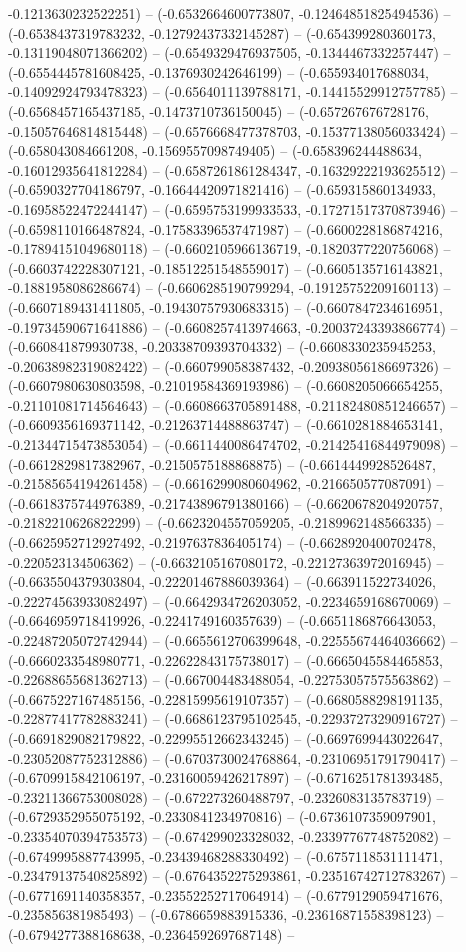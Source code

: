 -0.1213630232522251) -- (-0.6532664600773807, -0.12464851825494536) -- (-0.6538437319783232, -0.12792437332145287) -- (-0.654399280360173, -0.13119048071366202) -- (-0.6549329476937505, -0.1344467332257447) -- (-0.6554445781608425, -0.1376930242646199) -- (-0.655934017688034, -0.14092924793478323) -- (-0.6564011139788171, -0.14415529912757785) -- (-0.6568457165437185, -0.1473710736150045) -- (-0.657267676728176, -0.15057646814815448) -- (-0.6576668477378703, -0.15377138056033424) -- (-0.658043084661208, -0.1569557098749405) -- (-0.658396244488634, -0.16012935641812284) -- (-0.6587261861284347, -0.16329222193625512) -- (-0.6590327704186797, -0.16644420971821416) -- (-0.659315860134933, -0.16958522472244147) -- (-0.6595753199933533, -0.17271517370873946) -- (-0.6598110166487824, -0.17583396537471987) -- (-0.6600228186874216, -0.17894151049680118) -- (-0.6602105966136719, -0.1820377220756068) -- (-0.6603742228307121, -0.18512251548559017) -- (-0.6605135716143821, -0.1881958086286674) -- (-0.6606285190799294, -0.19125752209160113) -- (-0.6607189431411805, -0.19430757930683315) -- (-0.6607847234616951, -0.19734590671641886) -- (-0.6608257413974663, -0.20037243393866774) -- (-0.660841879930738, -0.20338709393704332) -- (-0.6608330235945253, -0.20638982319082422) -- (-0.660799058387432, -0.20938056186697326) -- (-0.6607980630803598, -0.21019584369193986) -- (-0.6608205066654255, -0.21101081714564643) -- (-0.6608663705891488, -0.21182480851246657) -- (-0.6609356169371142, -0.21263714488863747) -- (-0.6610281884653141, -0.21344715473853054) -- (-0.6611440086474702, -0.21425416844979098) -- (-0.6612829817382967, -0.2150575188868875) -- (-0.6614449928526487, -0.21585654194261458) -- (-0.6616299080604962, -0.216650577087091) -- (-0.6618375744976389, -0.21743896791380166) -- (-0.6620678204920757, -0.2182210626822299) -- (-0.6623204557059205, -0.2189962148566335) -- (-0.6625952712927492, -0.2197637836405174) -- (-0.6628920400702478, -0.220523134506362) -- (-0.6632105167080172, -0.22127363972016945) -- (-0.6635504379303804, -0.22201467886039364) -- (-0.663911522734026, -0.22274563933082497) -- (-0.6642934726203052, -0.2234659168670069) -- (-0.6646959718419926, -0.2241749160357639) -- (-0.6651186876643053, -0.22487205072742944) -- (-0.6655612706399648, -0.22555674464036662) -- (-0.6660233548980771, -0.22622843175738017) -- (-0.6665045584465853, -0.22688655681362713) -- (-0.667004483488054, -0.22753057575563862) -- (-0.6675227167485156, -0.22815995619107357) -- (-0.6680588298191135, -0.22877417782883241) -- (-0.6686123795102545, -0.22937273290916727) -- (-0.6691829082179822, -0.22995512662343245) -- (-0.6697699443022647, -0.23052087752312886) -- (-0.6703730024768864, -0.23106951791790417) -- (-0.6709915842106197, -0.23160059426217897) -- (-0.6716251781393485, -0.23211366753008028) -- (-0.672273260488797, -0.2326083135783719) -- (-0.6729352955075192, -0.2330841234970816) -- (-0.6736107359097901, -0.23354070394753573) -- (-0.674299023328032, -0.23397767748752082) -- (-0.6749995887743995, -0.23439468288330492) -- (-0.6757118531111471, -0.23479137540825892) -- (-0.6764352275293861, -0.23516742712783267) -- (-0.6771691140358357, -0.23552252717064914) -- (-0.6779129059471676, -0.235856381985493) -- (-0.6786659883915336, -0.23616871558398123) -- (-0.6794277388168638, -0.2364592697687148) -- 
